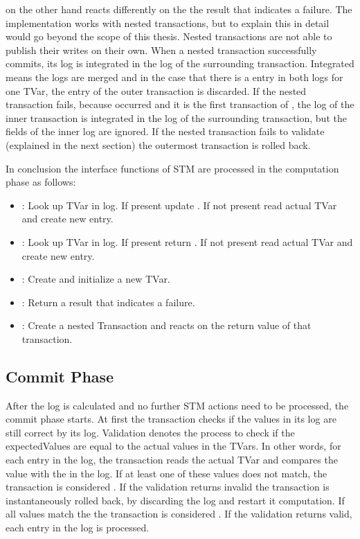  on the other hand reacts differently on the the result that indicates a failure. The implementation works with nested transactions, 
but to explain this in detail would go beyond the scope of this thesis. Nested transactions are not able to publish their writes on their own.
When a nested transaction successfully commits, its log is integrated in the log of the surrounding transaction. 
Integrated means the logs are merged and in the case that there is a entry in both logs for one TVar, the entry of the outer transaction is discarded.
If the nested transaction fails, because  occurred and it is the first transaction of , the log of the inner transaction
is integrated in the log of the surrounding transaction, but the  fields of the inner log are ignored. If the nested transaction
fails to validate (explained in the next section) the outermost transaction is rolled back.

In conclusion the interface functions of STM are processed in the computation phase as follows:
\begin{itemize}
 \item {}: Look up TVar in log. If present update . If not present read actual TVar and create new entry.
 \item {}: Look up TVar in log. If present return . If not present read actual TVar and create new entry.
 \item {}: Create and initialize a new TVar. 
 \item {}: Return a result that indicates a failure.
 \item {}: Create a nested Transaction and reacts on the return value of that transaction.
\end{itemize}

\subsection{Commit Phase}
\label{Sec:STMImplCommit}
After the log is calculated and no further STM actions need to be processed, the commit phase starts.
At first the transaction checks if the values in its log are still correct by  its log.
Validation denotes the process to check if the expectedValues are equal to the actual values in the TVars.
In other words, for each entry in the log, the transaction reads the actual TVar and compares the value with 
the  in the log. If at least one of these values does not match, the transaction is considered
. If the validation returns invalid the transaction is instantaneously rolled back, by discarding the log 
and restart it computation. If all values match the the transaction is considered . If the validation
returns valid, each entry in the log is processed. 

